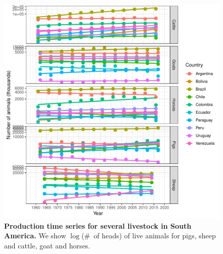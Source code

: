\documentclass[a4paper,10pt]{article}
\begin{document}
\begin{center}
\begin{figure}[H]
\begin{center}
\includegraphics[scale=.80]{FIGURES/PLOTS/production.pdf}
\end{center}
\caption{
\textbf{Production time series for several livestock in South America.}
We show $\log$(\#~of heads) of live animals for pigs, sheep and cattle, goat and horses.
}
\label{sfig:prod}
\end{figure}
\end{center}
\newpage
\end{document}
